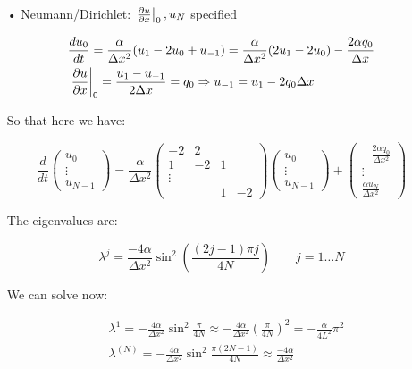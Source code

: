 \begin{itemize}
\item[•] Neumann/Dirichlet: $\left.\frac{\partial u}{\partial x}\right|_0, u_N$ specified

\begin{equation}
\begin{aligned}
&\frac{d u _0}{dt} = \frac{\alpha}{\Delta x^2} (u_1 -2u_0 + u_{-1}) = \frac{\alpha }{\Delta x^2}(2u_1 - 2 u_0) - \frac{2\alpha q_0}{\Delta x}\\
&\left. \frac{\partial u}{\partial x}\right|_0 = \frac{u_1 - u_{-1}}{2\Delta x} = q_0 \Rightarrow u_{-1} = u_1 - 2q_0 \Delta x
\end{aligned}
\end{equation}

So that here we have: 

\begin{equation}
\frac{d}{dt} \left(\begin{array}{c}
u_0\\
\vdots\\
u_{N-1}
\end{array} \right) = \frac{\alpha }{\Delta x^2}
\left(
\begin{array}{cccc}
-2 & 2 &  \\
1 & -2 & 1&  \\
\vdots\\
&  & 1 & -2
\end{array}
\right)\left(\begin{array}{c}
u_0\\
\vdots\\
u_{N-1}
\end{array} \right)
+
\left(\begin{array}{c}
-\frac{2\alpha q_0}{\Delta x^2}\\
\vdots\\
\frac{\alpha u_N}{\Delta x^2}
\end{array} \right)
\end{equation}

The eigenvalues are: 

\begin{equation}
\lambda ^{j} = \frac{-4\alpha}{\Delta x^2}\sin ^2 \left( \frac{(2j-1)\pi j}{4N} \right) \qquad j = 1 \dots N
\end{equation}

We can solve now: 

\begin{equation}
\begin{aligned}
&\lambda ^{1} = -\frac{4\alpha}{\Delta x^2} \sin ^2 \frac{\pi}{4N} \approx - \frac{4\alpha}{\Delta x^2} \left( \frac{\pi}{4N} \right)^2 = - \frac{\alpha}{4L^2}\pi ^2\\
&\lambda ^{(N)} = -\frac{4\alpha}{\Delta x^2} \sin ^2 \frac{\pi (2N-1)}{4 N}\approx \frac{-4 \alpha}{\Delta x^2} 
\end{aligned}
\end{equation}



\end{itemize}
